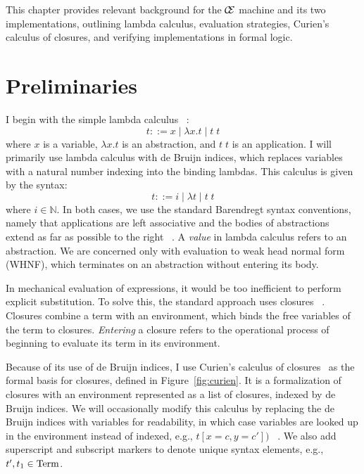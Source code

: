 This chapter provides relevant background for the $\mathcal{\mathcal{C} \mskip
-4mu \mathcal{E}}$ machine and its two implementations, outlining lambda
calculus, evaluation strategies, Curien's calculus of closures, and verifying
implementations in formal logic. 

\section{Preliminaries} \label{sec:prelim}

I begin with the simple lambda calculus ~\cite{barendregt1984lambda}:  $$ t::= x
\; | \;  \lambda x.t \; | \;  t \; t $$ where $x$ is a variable, $\lambda x.t$
is an abstraction, and $t \; t$ is an application. I will primarily use lambda
calculus with de Bruijn indices, which replaces variables with a natural number
indexing into the binding lambdas.  This calculus is given by the syntax: $$
t::= i \; | \; \lambda t \; | \; t \; t $$ where $i \in \mathbb{N}$. In both
cases, we use the standard Barendregt syntax conventions, namely that
applications are left associative and the bodies of abstractions extend as far
as possible to the right ~\cite{barendregt1984lambda}.  A \emph{value} in lambda
calculus refers to an abstraction. We are concerned only with evaluation to weak
head normal form (WHNF), which terminates on an abstraction without entering its
body.

In mechanical evaluation of expressions, it would be too inefficient to perform
explicit substitution. To solve this, the standard approach uses closures
~\cite{landin1964mechanical,curien1991abstract,jonesstg,biernacka2007concrete}.
Closures combine a term with an environment, which binds the free variables of
the term to closures. \emph{Entering} a closure refers to the operational
process of beginning to evaluate its term in its environment.

Because of its use of de Bruijn indices, I use Curien's calculus of
closures~\cite{curien1991abstract} as the formal basis for closures,
defined in Figure~\ref{fig:curien}. It is a formalization of closures with an
environment represented as a list of closures, indexed by de Bruijn indices. We
will occasionally modify this calculus by replacing the de Bruijn indices with
variables for readability, in which case variables are looked up in the
environment instead of indexed, e.g., $t[x = c, y = c'])$
~\cite{barendregt1984lambda}. We also add superscript and subscript markers to
denote unique syntax elements, e.g., $t', t_1 \in \textnormal{Term}$. 


